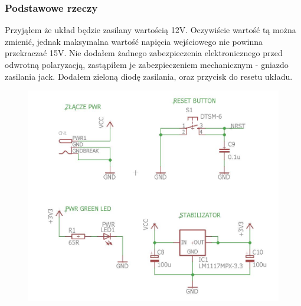 \documentclass[12pt]{article}
\begin{document}
\subsubsection{Podstawowe rzeczy}
Przyjąłem że układ będzie zasilany wartością 12V. Oczywiście wartość tą można zmienić, jednak maksymalna wartość napięcia wejściowego nie powinna przekraczać 15V. Nie dodałem żadnego zabezpieczenia elektronicznego przed odwrotną polaryzacją, zastąpiłem je zabezpieczeniem mechanicznym - gniazdo zasilania jack. Dodałem zieloną diodę zasilania, oraz przycisk do resetu układu. 
\begin{figure}[H]
\begin{center}
\includegraphics[width=1\textwidth]{figures/schemat1.jpg}
\end{center}
\end{figure}
\end{document}
